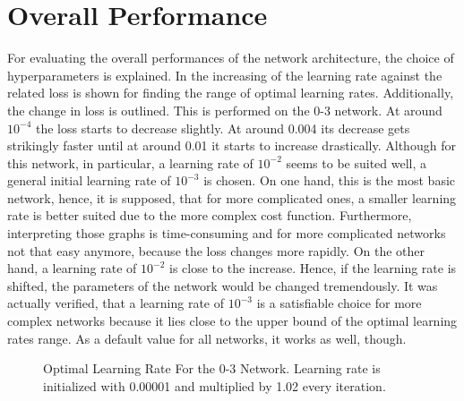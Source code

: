 \section{Overall Performance}
\label{sec:results-overall}
For evaluating the overall performances of the network architecture, the choice of hyperparameters is explained.
In  the increasing of the learning rate against the related loss is shown for finding the range of optimal learning rates.
Additionally, the change in loss is outlined.
This is performed on the 0-3 network.
At around $10^{-4}$ the loss starts to decrease slightly.
At around 0.004 its decrease gets strikingly faster until at around 0.01 it starts to increase drastically.
Although for this network, in particular, a learning rate of $10^{-2}$ seems to be suited well, a general initial learning rate of $10^{-3}$ is chosen.
On one hand, this is the most basic network, hence, it is supposed, that for more complicated ones, a smaller learning rate is better suited due to the more complex cost function.
Furthermore, interpreting those graphs is time-consuming and for more complicated networks not that easy anymore, because the loss changes more rapidly.
On the other hand, a learning rate of $10^{-2}$ is close to the increase.
Hence, if the learning rate is shifted, the parameters of the network would be changed tremendously.
It was actually verified, that a learning rate of $10^{-3}$ is a satisfiable choice for more complex networks because it lies close to the upper bound of the optimal learning rates range.
As a default value for all networks, it works as well, though.
\begin{figure}
	\setlength{}
	\setlength{}
	\centering
	\begin{subfigure}{.5\textwidth}
		\centering
		
	\end{subfigure}%
	\begin{subfigure}{.5\textwidth}
		\centering
		
	\end{subfigure}
	\caption[Optimal Learning Rate For the 0-3 Network]{Optimal Learning Rate For the 0-3 Network. Learning rate is initialized with 0.00001 and multiplied by 1.02 every iteration.}
	\label{fig:optimal-learning-rate}
\end{figure}

